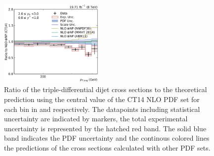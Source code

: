 \begin{figure}[htbp]
    \includegraphics[width=0.45\textwidth]{figures/measurement/ratio_to_CT14nlo+np_totcomp_yb2ys0.pdf}
    \caption[Ratio of the cross section to CT14 NLO]{
    Ratio of the triple-differential dijet cross sections to the theoretical
    prediction using the central value of the CT14 NLO PDF set for each bin in \ystar
    and \yboost respectively. The datapoints including statistical uncertainty are
    indicated by markers, the total experimental uncertainty is represented by the
    hatched red band. The solid blue band indicates the PDF uncertainty and the
    continous colored lines the predictions of the cross sections calculated with
    other PDF sets. }
    \label{fig:ratio_ct14_nlo}
\end{figure}

